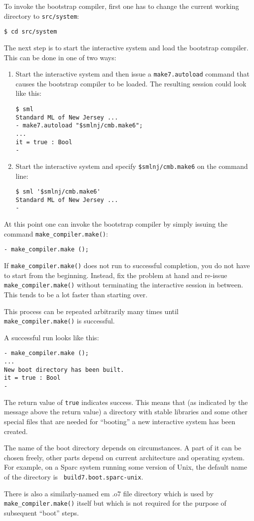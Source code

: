 To invoke the bootstrap compiler, first one has to change the current
working directory to {\tt src/system}:

\begin{verbatim}
$ cd src/system
\end{verbatim}

The next step is to start the interactive system and load the
bootstrap compiler.  This can be done in one of two ways:

\begin{enumerate}
\item Start the interactive system and then issue a {\tt make7.autoload}
command that causes the bootstrap compiler to be loaded. The resulting
session could look like this:
\begin{verbatim}
$ sml
Standard ML of New Jersey ...
- make7.autoload "$smlnj/cmb.make6";
...
it = true : Bool
-
\end{verbatim}
\item Start the interactive system and specify {\tt \$smlnj/cmb.make6} on
the command line:
\begin{verbatim}
$ sml '$smlnj/cmb.make6'
Standard ML of New Jersey ...
-  
\end{verbatim}
\end{enumerate}

At this point one can invoke the bootstrap compiler by simply issuing
the command {\tt make_compiler.make()}:

\begin{verbatim}
- make_compiler.make ();
\end{verbatim}

If {\tt make_compiler.make()} does not run to successful completion, you do not
have to start from the beginning.  Instead, fix the problem at hand
and re-issue {\tt make_compiler.make()} without terminating the interactive
session in between.  This tends to be a lot faster than starting over.

This process can be repeated arbitrarily many times until {\tt
make_compiler.make()} is successful.

A successful run looks like this:

\begin{verbatim}
- make_compiler.make ();
...
New boot directory has been built.
it = true : Bool
- 
\end{verbatim}

The return value of {\tt true} indicates success.  This means that (as
indicated by the message above the return value) a directory with
stable libraries and some other special files that are needed for
``booting'' a new interactive system has been created.

The name of the boot directory depends on circumstances.  A part of it
can be chosen freely, other parts depend on current architecture and
operating system.  For example, on a Sparc system running some version
of Unix, the default name of the directory is {\tt
build7.boot.sparc-unix}.

There is also a similarly-named {em .o7 file directory} which is used
by {\tt make_compiler.make()} itself but which is not required for the purpose
of subsequent ``boot'' steps.

